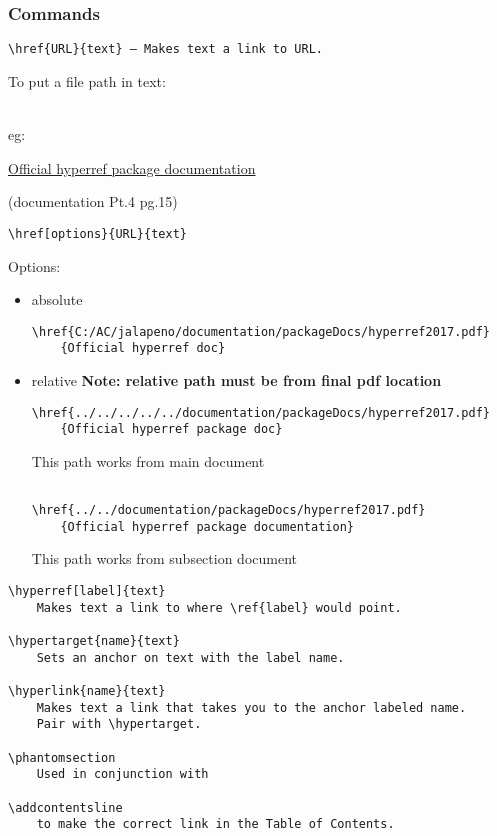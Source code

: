 \subsubsection[Commands]{\Large Commands}
\begin{verbatim}
\href{URL}{text} — Makes text a link to URL.
\end{verbatim}

\begin{Large}To put a file path in text:\end{Large}\\
eg:

\href{../../documentation/packageDocs/hyperref2017.pdf}{Official hyperref package documentation}

\begin{tiny}(documentation Pt.4 pg.15)\end{tiny}
\begin{verbatim}
\href[options}{URL}{text}
\end{verbatim}

Options:\begin{itemize}
\item absolute
\begin{footnotesize}
\begin{verbatim}
\href{C:/AC/jalapeno/documentation/packageDocs/hyperref2017.pdf}
    {Official hyperref doc}
\end{verbatim}
\end{footnotesize}

\item relative \textbf{Note: relative path must be from final pdf location}
\begin{footnotesize}
\begin{verbatim}
\href{../../../../../documentation/packageDocs/hyperref2017.pdf}
    {Official hyperref package doc}
\end{verbatim}
This path works from main document
\begin{verbatim}

\href{../../documentation/packageDocs/hyperref2017.pdf}
    {Official hyperref package documentation}
\end{verbatim}
This path works from subsection document

\end{footnotesize}

\end{itemize}

\begin{verbatim}
\hyperref[label]{text}
    Makes text a link to where \ref{label} would point.

\hypertarget{name}{text}
    Sets an anchor on text with the label name.

\hyperlink{name}{text}
    Makes text a link that takes you to the anchor labeled name.
    Pair with \hypertarget.

\phantomsection
    Used in conjunction with

\addcontentsline
    to make the correct link in the Table of Contents.
\end{verbatim}


